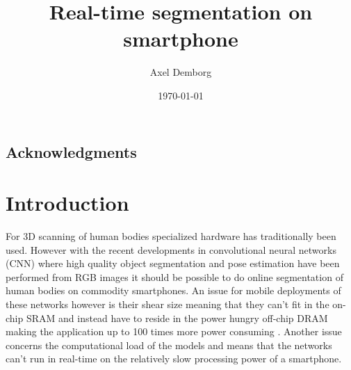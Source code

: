 \documentclass{kththesis}
\title{Real-time segmentation on smartphone}
\author{Axel Demborg}
\date{\today}
\begin{document}
\listoftodos

\frontmatter

\titlepage

\begin{abstract}

\end{abstract}


\begin{otherlanguage}{swedish}
  \begin{abstract}
  \end{abstract}
\end{otherlanguage}

\section*{Acknowledgments}




\tableofcontents


\mainmatter


\chapter{Introduction}
For 3D scanning of human bodies specialized hardware has traditionally been
used. However with the recent developments in convolutional neural networks
(CNN) where high quality object segmentation \parencite{BriefHistory} and pose
estimation \parencite{he2017mask} have been performed from RGB images it should
be possible to do online segmentation of human bodies on commodity smartphones. An issue
for mobile deployments of these networks however is their shear size meaning
that they can't fit in the on-chip SRAM and instead have to reside in the power
hungry off-chip DRAM making the application up to 100 times more power consuming
\parencite{han2015learning}. Another issue concerns the computational load of
the models and means that the networks can't run in real-time on the relatively
slow processing power of a smartphone. 
\end{document}
